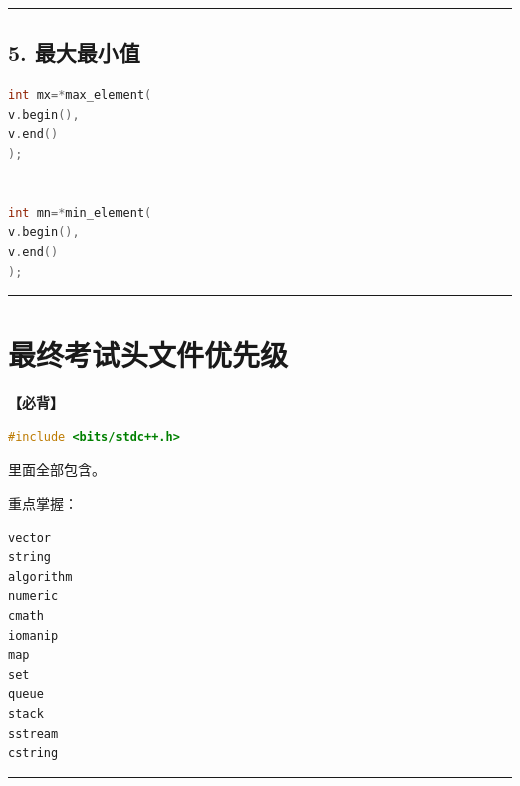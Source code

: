 \documentclass[10pt,twocolumn]{extarticle}
\begin{document}
\noindent\rule{\linewidth}{0.4pt}

\subsection{5. 最大最小值}
\begin{lstlisting}[language=C++]
int mx=*max_element(
v.begin(),
v.end()
);


int mn=*min_element(
v.begin(),
v.end()
);
\end{lstlisting}

\noindent\rule{\linewidth}{0.4pt}

\section{最终考试头文件优先级}

\textbf{【必背】}
\begin{lstlisting}[language=C++]
#include <bits/stdc++.h>
\end{lstlisting}
里面全部包含。

重点掌握：
\begin{lstlisting}
vector
string
algorithm
numeric
cmath
iomanip
map
set
queue
stack
sstream
cstring
\end{lstlisting}

\noindent\rule{\linewidth}{0.4pt}
\end{document}
